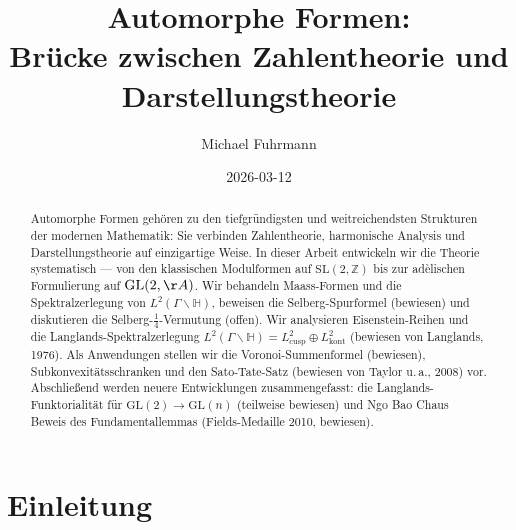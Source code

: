 \documentclass[12pt,a4paper]{amsart}
\theoremstyle{definition}
\newcommand{\HH}{\mathbb{H}}
\newcommand{\ZZ}{\mathbb{Z}}
\newcommand{\GL}{\mathrm{GL}}
\newcommand{\SL}{\mathrm{SL}}
\begin{document}
\title{Automorphe Formen:\\
Brücke zwischen Zahlentheorie und Darstellungstheorie}

\author{Michael Fuhrmann}

\address{Specialist Mathematics Project, Build 143}


\date{2026-03-12}



\begin{abstract}
Automorphe Formen gehören zu den tiefgründigsten und weitreichendsten Strukturen
der modernen Mathematik: Sie verbinden Zahlentheorie, harmonische Analysis und
Darstellungstheorie auf einzigartige Weise. In dieser Arbeit entwickeln wir die
Theorie systematisch — von den klassischen Modulformen auf $\SL(2,\ZZ)$ bis zur
adèlischen Formulierung auf $\GL(2,\AA)$. Wir behandeln Maass-Formen und die
Spektralzerlegung von $L^2(\Gamma \backslash \HH)$, beweisen die Selberg-Spurformel
(bewiesen) und diskutieren die Selberg-$\tfrac{1}{4}$-Vermutung (offen). Wir
analysieren Eisenstein-Reihen und die Langlands-Spektralzerlegung
$L^2(\Gamma \backslash \HH) = L^2_{\mathrm{cusp}} \oplus L^2_{\mathrm{kont}}$
(bewiesen von Langlands, 1976). Als Anwendungen stellen wir die Voronoi-Summenformel
(bewiesen), Subkonvexitätsschranken und den Sato-Tate-Satz (bewiesen von Taylor u.\,a.,
2008) vor. Abschließend werden neuere Entwicklungen zusammengefasst: die Langlands-Funk\-torialität
für $\GL(2) \to \GL(n)$ (teilweise bewiesen) und Ngo Bao Chaus Beweis des Fundamentallemmas
(Fields-Medaille 2010, bewiesen).
\end{abstract}

\maketitle

\section{Einleitung}
\label{sec:einleitung}
\end{document}
